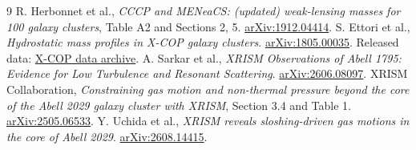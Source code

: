 \documentclass[11pt]{article}
\begin{document}
\begin{thebibliography}{9}\small
{}
R. Herbonnet et al., \emph{CCCP and MENeaCS: (updated) weak-lensing masses for 100 galaxy clusters}, Table A2 and Sections 2, 5.
\href{https://arxiv.org/abs/1912.04414}{arXiv:1912.04414}.
S. Ettori et al., \emph{Hydrostatic mass profiles in X-COP galaxy clusters}.
\href{https://arxiv.org/abs/1805.00035}{arXiv:1805.00035}.
Released data: \href{https://dominiqueeckert.wixsite.com/xcop/data}{X-COP data archive}.
A. Sarkar et al., \emph{XRISM Observations of Abell 1795: Evidence for Low Turbulence and Resonant Scattering}.
\href{https://arxiv.org/abs/2606.08097}{arXiv:2606.08097}.
XRISM Collaboration, \emph{Constraining gas motion and non-thermal pressure beyond the core of the Abell 2029 galaxy cluster with XRISM}, Section 3.4 and Table 1.
\href{https://arxiv.org/abs/2505.06533}{arXiv:2505.06533}.
Y. Uchida et al., \emph{XRISM reveals sloshing-driven gas motions in the core of Abell 2029}.
\href{https://arxiv.org/abs/2608.14415}{arXiv:2608.14415}.
\end{thebibliography}
\end{document}
